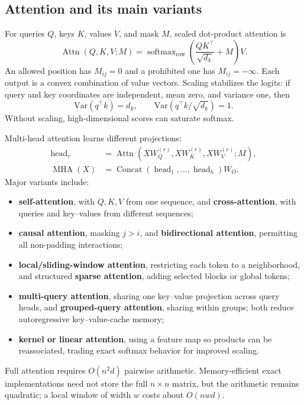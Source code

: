 \documentclass[12pt,oneside]{book}
\numberwithin{equation}{section}
\theoremstyle{definition}
\theoremstyle{plain}
\theoremstyle{remark}
\newcommand{\Var}{\mathrm{Var}}
\begin{document}
\subsection{Attention and its main variants}

For queries $Q$, keys $K$, values $V$, and mask $M$, scaled dot-product
attention is
\begin{equation}
 \operatorname{Attn}(Q,K,V;M)
 =\operatorname{softmax}_{\mathrm{row}}
 \!\left(\frac{QK^\top}{\sqrt{d_k}}+M\right)V.
 \label{eq:scaled-dot-product-attention}
\end{equation}
An allowed position has $M_{ij}=0$ and a prohibited one has
$M_{ij}=-\infty$.  Each output is a convex combination of value vectors.
Scaling stabilizes the logits: if query and key coordinates are independent,
mean zero, and variance one, then
\[
 \Var(q^\top k)=d_k,
 \qquad
 \Var(q^\top k/\sqrt{d_k})=1.
\]
Without scaling, high-dimensional scores can saturate softmax.

Multi-head attention learns different projections:
\begin{align*}
 \operatorname{head}_r
 &=\operatorname{Attn}(XW_Q^{(r)},XW_K^{(r)},XW_V^{(r)};M),\\
 \operatorname{MHA}(X)
 &=\operatorname{Concat}(\operatorname{head}_1,\ldots,
                         \operatorname{head}_h)W_O.
\end{align*}
Major variants include:
\begin{itemize}
    \item \textbf{self-attention}, with $Q,K,V$ from one sequence, and
    \textbf{cross-attention}, with queries and key--values from different
    sequences;
    \item \textbf{causal attention}, masking $j>i$, and
    \textbf{bidirectional attention}, permitting all non-padding interactions;
    \item \textbf{local/sliding-window attention}, restricting each token to a
    neighborhood, and structured \textbf{sparse attention}, adding selected
    blocks or global tokens;
    \item \textbf{multi-query attention}, sharing one key--value projection
    across query heads, and \textbf{grouped-query attention}, sharing within
    groups; both reduce autoregressive key--value-cache memory;
    \item \textbf{kernel or linear attention}, using a feature map so products
    can be reassociated, trading exact softmax behavior for improved scaling.
\end{itemize}
Full attention requires $O(n^2d)$ pairwise arithmetic.  Memory-efficient exact
implementations need not store the full $n\times n$ matrix, but the arithmetic
remains quadratic; a local window of width $w$ costs about $O(nwd)$.
\end{document}
